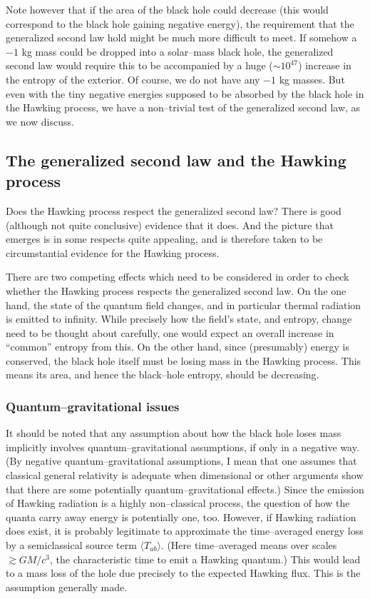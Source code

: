 Note however that if the area of the black hole could decrease (this
would correspond to the black hole gaining negative energy), the
requirement that the generalized second law hold might be much more
difficult to meet.  If somehow a $-1$ kg mass could be dropped into a
solar--mass black hole, the generalized second law would require this
to be accompanied by a huge ($\sim 10^{47}$) increase in the entropy
of the exterior.  Of course, we do not have any $-1$ kg masses.  But
even with the tiny negative energies supposed to be absorbed by the
black hole in the Hawking process, we have a non--trivial test of the
generalized second law, as we now discuss.

\subsection{The generalized second law and the Hawking process}

Does the Hawking process respect the generalized second law?  There is
good (although not quite conclusive) evidence that it does.  And the
picture that emerges is in some respects quite appealing, and is
therefore taken to be circumstantial evidence for the Hawking process.

There are two competing effects which need to be considered in order
to check whether the Hawking process respects the generalized second
law.  On the one hand, the state of the quantum field changes, and in
particular thermal radiation is emitted to infinity.  While precisely
how the field's state, and entropy, change need to be thought about
carefully, one would expect an overall increase in ``common'' entropy
from this.  On the other hand, since (presumably) energy is conserved,
the black hole itself must be losing mass in the Hawking process.
This means its area, and hence the black--hole entropy, should be
decreasing.

\subsubsection{Quantum--gravitational issues}

It should be noted that any assumption about how the black hole loses mass
implicitly involves quantum--gravitational assumptions, if only in a negative
way.   (By negative quantum--gravitational assumptions, I mean that one assumes
that classical general relativity is adequate when dimensional or other
arguments show that there are some potentially quantum--gravitational effects.)
Since the emission of Hawking radiation is a highly non--classical process, the
question of how the quanta carry away energy is potentially one, too.  
However, if Hawking radiation does exist, it is probably legitimate to
approximate the time--averaged energy loss by a semiclassical source term
$\langle T_{ab}\rangle$.  (Here time--averaged means over scales $\gtrsim
GM/c^3$, the characteristic time to emit a Hawking quantum.) This would lead to
a mass loss of the hole due precisely to the expected Hawking flux.  This is
the assumption generally made.

